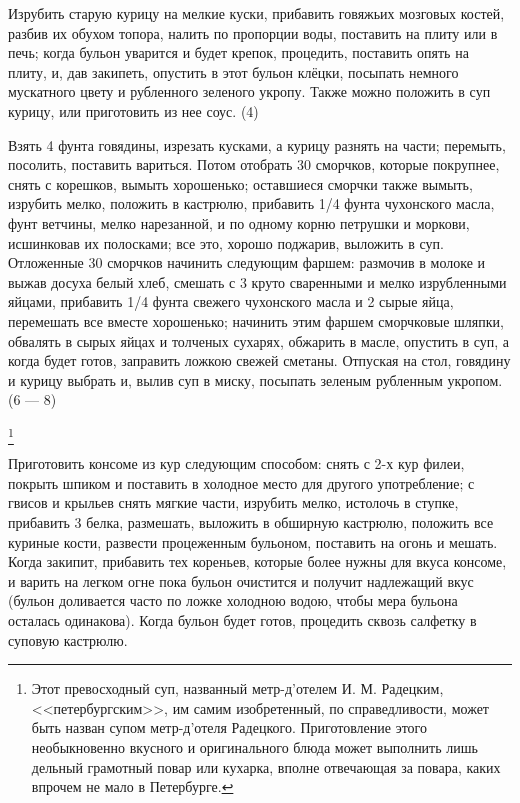 
Изрубить старую курицу на мелкие куски, прибавить говяжьих мозговых костей, разбив их обухом топора, налить по пропорции воды, поставить на плиту или в печь; когда бульон уварится и будет крепок, процедить, поставить опять на плиту, и, дав закипеть, опустить в этот бульон клёцки, посыпать немного мускатного цвету и рубленного зеленого укропу. Также можно положить в суп курицу, или приготовить из нее соус. (4)


Взять 4 фунта говядины, изрезать кусками, а курицу разнять на части; перемыть, посолить, поставить вариться. Потом отобрать 30 сморчков, которые покрупнее, снять с корешков, вымыть хорошенько; оставшиеся сморчки также вымыть, изрубить мелко, положить в кастрюлю, прибавить 1/4 фунта чухонского масла, фунт ветчины, мелко нарезанной, и по одному корню петрушки и моркови, исшинковав их полосками; все это, хорошо поджарив, выложить в суп. Отложенные 30 сморчков начинить следующим фаршем: размочив в молоке и выжав досуха белый хлеб, смешать с 3 круто сваренными и мелко изрубленными яйцами, прибавить 1/4 фунта свежего чухонского масла и 2 сырые яйца, перемешать все вместе хорошенько; начинить этим фаршем сморчковые шляпки, обвалять в сырых яйцах и толченых сухарях, обжарить в масле, опустить в суп, а когда будет готов, заправить ложкою свежей сметаны. Отпуская на стол, говядину и курицу выбрать и, вылив суп в миску, посыпать зеленым рубленным укропом. (6 — 8)

\footnote{Этот превосходный суп, названный метр-д'отелем И. М. Радецким, <<петербургским>>, им самим изобретенный, по справедливости, может быть назван супом метр-д'отеля Радецкого. Приготовление этого необыкновенно вкусного и оригинального блюда может выполнить лишь дельный грамотный повар или кухарка, вполне отвечающая за повара, каких впрочем не мало в Петербурге.}

Приготовить консоме из кур следующим способом: снять с 2-х кур филеи, покрыть шпиком и поставить в холодное место для другого употребление; с гвисов и крыльев снять мягкие части, изрубить мелко, истолочь в ступке, прибавить 3 белка, размешать, выложить в обширную кастрюлю, положить все куриные кости, развести процеженным бульоном, поставить на огонь и мешать. Когда закипит, прибавить тех кореньев, которые более нужны для вкуса консоме, и варить на легком огне пока бульон очистится и получит надлежащий вкус (бульон доливается часто по ложке холодною водою, чтобы мера бульона осталась одинакова). Когда бульон будет готов, процедить сквозь салфетку в суповую кастрюлю.

